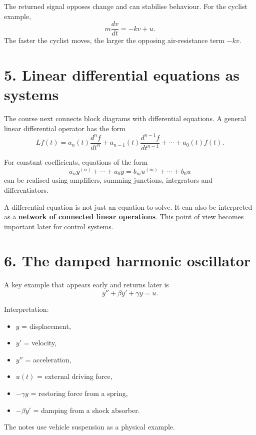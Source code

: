 \documentclass[11pt,a4paper]{article}
\begin{document}
\begin{keybox}
The returned signal opposes change and can stabilise behaviour. For the cyclist example,
\[
m\frac{dv}{dt}=-kv+u.
\]
The faster the cyclist moves, the larger the opposing air-resistance term $-kv$.
\end{keybox}

\section{5. Linear differential equations as systems}

The course next connects block diagrams with differential equations. A general linear differential operator has the form
\[
Lf(t)=a_n(t)\frac{d^nf}{dt^n}+a_{n-1}(t)\frac{d^{n-1}f}{dt^{n-1}}+\cdots+a_0(t)f(t).
\]

For constant coefficients, equations of the form
\[
a_ny^{(n)}+\cdots+a_0y
=b_mu^{(m)}+\cdots+b_0u
\]
can be realised using amplifiers, summing junctions, integrators and differentiators.

\begin{rememberbox}
A differential equation is not just an equation to solve. It can also be interpreted as a \textbf{network of connected linear operations}. This point of view becomes important later for control systems.
\end{rememberbox}

\section{6. The damped harmonic oscillator}

A key example that appears early and returns later is
\[
\boxed{y''+\beta y'+\gamma y=u.}
\]

Interpretation:
\begin{itemize}[leftmargin=1.2cm]
\item $y$ = displacement,
\item $y'$ = velocity,
\item $y''$ = acceleration,
\item $u(t)$ = external driving force,
\item $-\gamma y$ = restoring force from a spring,
\item $-\beta y'$ = damping from a shock absorber.
\end{itemize}

The notes use vehicle suspension as a physical example.
\end{document}
